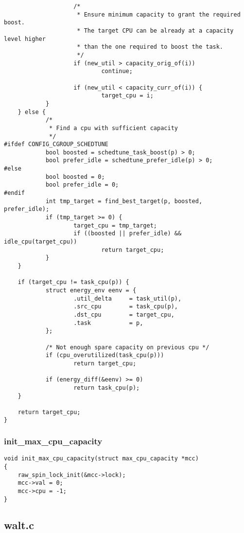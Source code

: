 \documentclass{article}
\begin{document}
\begin{verbatim}
                    /*
                     * Ensure minimum capacity to grant the required boost.
                     * The target CPU can be already at a capacity level higher
                     * than the one required to boost the task.
                     */
                    if (new_util > capacity_orig_of(i))
                            continue;

                    if (new_util < capacity_curr_of(i)) {
                            target_cpu = i;
            }
    } else {
            /*
             * Find a cpu with sufficient capacity
             */
#ifdef CONFIG_CGROUP_SCHEDTUNE
            bool boosted = schedtune_task_boost(p) > 0;
            bool prefer_idle = schedtune_prefer_idle(p) > 0;
#else
            bool boosted = 0;
            bool prefer_idle = 0;
#endif
            int tmp_target = find_best_target(p, boosted, prefer_idle);
            if (tmp_target >= 0) {
                    target_cpu = tmp_target;
                    if ((boosted || prefer_idle) && idle_cpu(target_cpu))
                            return target_cpu;
            }
    }

    if (target_cpu != task_cpu(p)) {
            struct energy_env eenv = {
                    .util_delta     = task_util(p),
                    .src_cpu        = task_cpu(p),
                    .dst_cpu        = target_cpu,
                    .task           = p,
            };

            /* Not enough spare capacity on previous cpu */
            if (cpu_overutilized(task_cpu(p)))
                    return target_cpu;

            if (energy_diff(&eenv) >= 0)
                    return task_cpu(p);
    }

    return target_cpu;
}
\end{verbatim}

\subsubsection{init\_max\_cpu\_capacity}

\begin{verbatim}
void init_max_cpu_capacity(struct max_cpu_capacity *mcc)
{
    raw_spin_lock_init(&mcc->lock);
    mcc->val = 0;
    mcc->cpu = -1;
}
\end{verbatim}


\subsection{walt.c}
\end{document}

